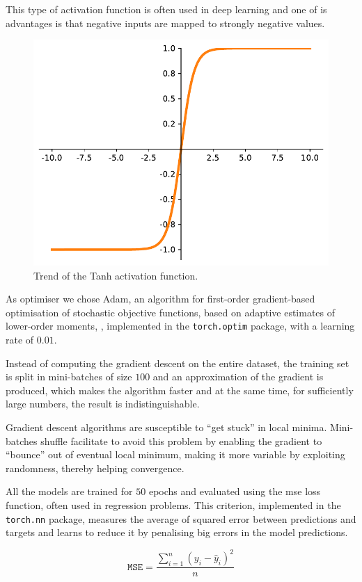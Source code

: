 This type of activation function is often used in deep learning and one of is 
advantages is that negative inputs are mapped to strongly negative values.

\begin{figure}[!htb]
	\centering
	\includegraphics[width=.5\textwidth]{contents/images/tanh2}%
	\caption{Trend of the Tanh activation function.}
	\label{fig:tanh}
\end{figure}

As optimiser we chose Adam, {an algorithm for first-order gradient-based 
optimisation of stochastic objective functions, based on adaptive estimates of 
lower-order moments}, \cite[see][]{kingma2014adam, 
loshchilov2017decoupled}, 
implemented in the \texttt{torch.optim} package, with a learning rate of $0.01$. 

Instead of computing the gradient descent on the entire dataset, the training set is 
split in mini-batches of size $100$ and an approximation of the gradient is 
produced, which makes the algorithm faster and at the same time, for sufficiently 
large numbers, the result is indistinguishable.

Gradient descent algorithms are susceptible to ``get stuck'' in local minima.
Mini-batches shuffle facilitate to avoid this problem by enabling the gradient to 
``bounce'' out of eventual local minimum, making it more variable by exploiting 
randomness, thereby helping convergence.

All the models are trained for $50$ epochs and evaluated using the \gls{mse} loss 
function, often used in regression problems. 
This criterion, implemented in the \texttt{torch.nn} package, measures the 
average of squared error between predictions and targets and learns to reduce it 
by penalising big errors in the model predictions.

\begin{Equation}[!htb]
	\centering
	\begin{equation}
	\mathtt{MSE} = \frac{\sum_{i=1}^n (y_i-\hat y_i)^2}{n}
	\end{equation}
	\caption{Mean Squared Error (\gls{mse}) loss function.}
	\label{eq:mse}
\end{Equation}
	


